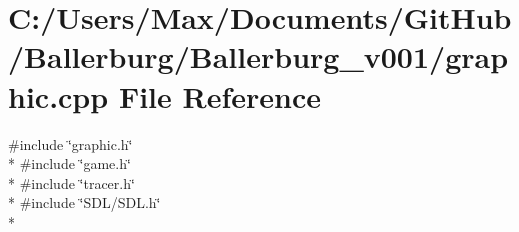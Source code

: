 \section{C\+:/\+Users/\+Max/\+Documents/\+Git\+Hub/\+Ballerburg/\+Ballerburg\+\_\+v001/graphic.cpp File Reference}
\label{graphic_8cpp}
{\ttfamily \#include \char`\"{}graphic.\+h\char`\"{}}\\*
{\ttfamily \#include \char`\"{}game.\+h\char`\"{}}\\*
{\ttfamily \#include \char`\"{}tracer.\+h\char`\"{}}\\*
{\ttfamily \#include \char`\"{}S\+D\+L/\+S\+D\+L.\+h\char`\"{}}\\*
